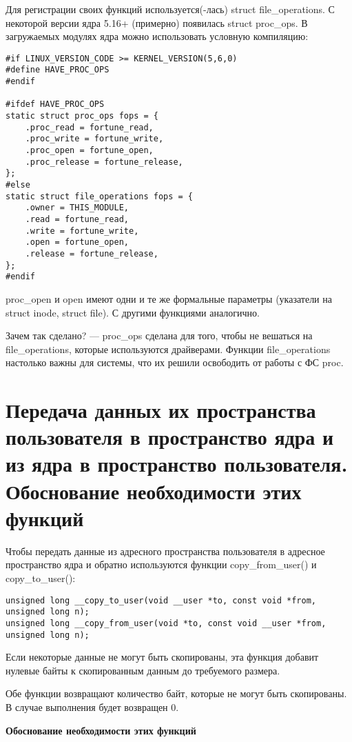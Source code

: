Для регистрации своих функций используется(-лась) struct file\_operations. С некоторой версии ядра 5.16+ (примерно) появилась struct proc\_ops. В загружаемых модулях ядра можно использовать условную компиляцию:

\begin{lstlisting}
#if LINUX_VERSION_CODE >= KERNEL_VERSION(5,6,0)
#define HAVE_PROC_OPS
#endif

#ifdef HAVE_PROC_OPS
static struct proc_ops fops = {
    .proc_read = fortune_read,
    .proc_write = fortune_write,
    .proc_open = fortune_open,
    .proc_release = fortune_release,
};
#else
static struct file_operations fops = {
    .owner = THIS_MODULE,
    .read = fortune_read,
    .write = fortune_write,
    .open = fortune_open,
    .release = fortune_release,
};
#endif
\end{lstlisting}

proc\_open и open имеют одни и те же формальные параметры (указатели на struct inode, struct file). С другими функциями аналогично.

Зачем так сделано? --- proc\_ops сделана для того, чтобы не вешаться на file\_operations, которые используются драйверами. Функции file\_operations настолько важны для системы, что их решили освободить от работы с ФС proc.

\section{Передача данных их пространства пользователя в пространство ядра и из ядра в пространство пользователя. Обоснование необходимости этих функций}

Чтобы передать данные из адресного пространства пользователя в адресное пространство ядра и обратно используются функции copy\_from\_user() и copy\_to\_user():

\begin{lstlisting}
unsigned long __copy_to_user(void __user *to, const void *from, unsigned long n);
unsigned long __copy_from_user(void *to, const void __user *from, unsigned long n);
\end{lstlisting}

Если некоторые данные не могут быть скопированы, эта функция добавит нулевые байты к скопированным данным до требуемого размера.

Обе функции возвращают количество байт, которые не могут быть скопированы. В случае выполнения будет возвращен 0.

\textbf{Обоснование необходимости этих функций}

